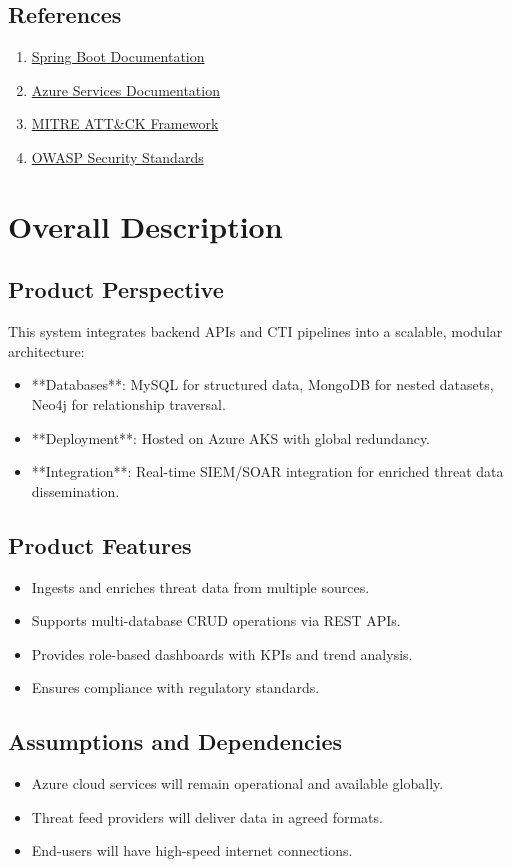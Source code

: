 \documentclass[12pt]{article}
\begin{document}
\subsection{References}
\begin{enumerate}
    \item \href{https://spring.io/projects/spring-boot}{Spring Boot Documentation}
    \item \href{https://azure.microsoft.com/}{Azure Services Documentation}
    \item \href{https://attack.mitre.org/}{MITRE ATT&CK Framework}
    \item \href{https://owasp.org}{OWASP Security Standards}
\end{enumerate}

\section{Overall Description}
\subsection{Product Perspective}
This system integrates backend APIs and CTI pipelines into a scalable, modular architecture:
\begin{itemize}
    \item **Databases**: MySQL for structured data, MongoDB for nested datasets, Neo4j for relationship traversal.
    \item **Deployment**: Hosted on Azure AKS with global redundancy.
    \item **Integration**: Real-time SIEM/SOAR integration for enriched threat data dissemination.
\end{itemize}

\subsection{Product Features}
\begin{itemize}
    \item Ingests and enriches threat data from multiple sources.
    \item Supports multi-database CRUD operations via REST APIs.
    \item Provides role-based dashboards with KPIs and trend analysis.
    \item Ensures compliance with regulatory standards.
\end{itemize}

\subsection{Assumptions and Dependencies}
\begin{itemize}
    \item Azure cloud services will remain operational and available globally.
    \item Threat feed providers will deliver data in agreed formats.
    \item End-users will have high-speed internet connections.
\end{itemize}
\end{document}
